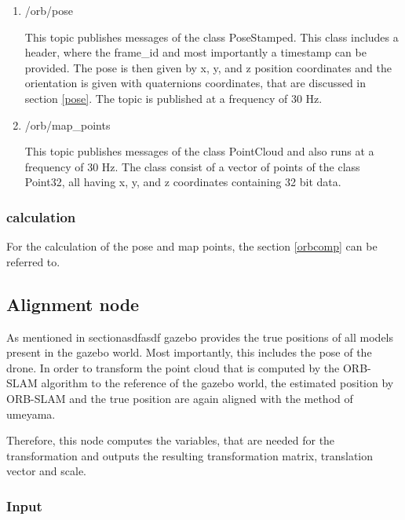 	\begin{enumerate}
	\item{/orb/pose}
	
	This topic publishes messages of the class PoseStamped. This class includes a header, where the frame\_id and most importantly a timestamp can be provided. 
	The pose is then given by x, y, and z position coordinates and the orientation is given with quaternions coordinates, that are discussed in section \ref{pose}. 
	The topic is published at a frequency of 30 Hz. 
	
	\item{/orb/map\_points}
	
	This topic publishes messages of the class PointCloud and also runs at a frequency of 30 Hz. The class consist of a vector of points of the 
	class Point32, all having x, y, and z coordinates containing 32 bit data. 
	 

	\end{enumerate}
	
	\subsubsection{calculation}
	
	For the calculation of the pose and map points, the section \ref{orbcomp} can be referred to. 
	

	
	\subsection{Alignment node}
	
	As mentioned in section{asdfasdf} gazebo provides the true positions of all models present in the gazebo world. Most importantly, this includes 
	the pose of the drone. In order to transform the point cloud that is computed by the ORB-SLAM algorithm to the reference of the gazebo world, the estimated 
	position by ORB-SLAM and the true position are again aligned with the method of umeyama. 
	
	Therefore, this node computes the variables, that are needed for the transformation and outputs the resulting transformation matrix, translation vector and scale. 
	
	
	\subsubsection{Input}
	
